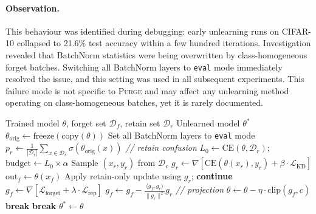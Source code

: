 \documentclass[10pt,twocolumn]{article}
\newcommand{\ours}{\textsc{Purge}}
\begin{document}
\paragraph{Observation.}
This behaviour was identified during debugging: early unlearning runs on CIFAR-10 collapsed to 21.6\% test accuracy within a few hundred iterations.
Investigation revealed that BatchNorm statistics were being overwritten by class-homogeneous forget batches.
Switching all BatchNorm layers to \texttt{eval} mode immediately resolved the issue, and this setting was used in all subsequent experiments.
This failure mode is not specific to \ours{} and may affect any unlearning method operating on class-homogeneous batches, yet it is rarely documented.

\begin{algorithm}[t]
\caption{\ours{} Unlearning}\label{alg:purge}
\begin{algorithmic}[1]
\REQUIRE Trained model $\theta$, forget set $\mathcal{D}_f$, retain set $\mathcal{D}_r$
\ENSURE Unlearned model $\theta^*$
\STATE $\theta_{\text{orig}} \leftarrow \text{freeze}(\text{copy}(\theta))$
\STATE Set all BatchNorm layers to \texttt{eval} mode
\STATE $p_r \leftarrow \frac{1}{|\mathcal{D}_r|}\sum_{x \in \mathcal{D}_r}\sigma(\theta_{\text{orig}}(x))$ \hfill \textit{// retain confusion}
\STATE $L_0 \leftarrow \text{CE}(\theta, \mathcal{D}_r)$; \quad $\text{budget} \leftarrow L_0 \times \alpha$
    \STATE Sample $(x_r, y_r)$ from $\mathcal{D}_r$
    \STATE $g_r \leftarrow \nabla[\text{CE}(\theta(x_r), y_r) + \beta \cdot \mathcal{L}_{\text{KD}}]$
    \STATE $\text{out}_f \leftarrow \theta(x_f)$
      \STATE Apply retain-only update using $g_r$; \textbf{continue}
    \ENDIF
    \STATE $g_f \leftarrow \nabla[\mathcal{L}_{\text{forget}} + \lambda \cdot \mathcal{L}_{\text{rep}}]$
      \STATE $g_f \leftarrow g_f - \frac{\langle g_f, g_r \rangle}{\|g_r\|^2} g_r$ \hfill \textit{// projection}
    \ENDIF
    \STATE $\theta \leftarrow \theta - \eta \cdot \text{clip}(g_f, c)$
  \ENDFOR
    \STATE \textbf{break}
  \ENDIF
    \STATE \textbf{break}
  \ENDIF
\ENDFOR
\RETURN $\theta^* \leftarrow \theta$
\end{algorithmic}
\end{algorithm}
\end{document}
